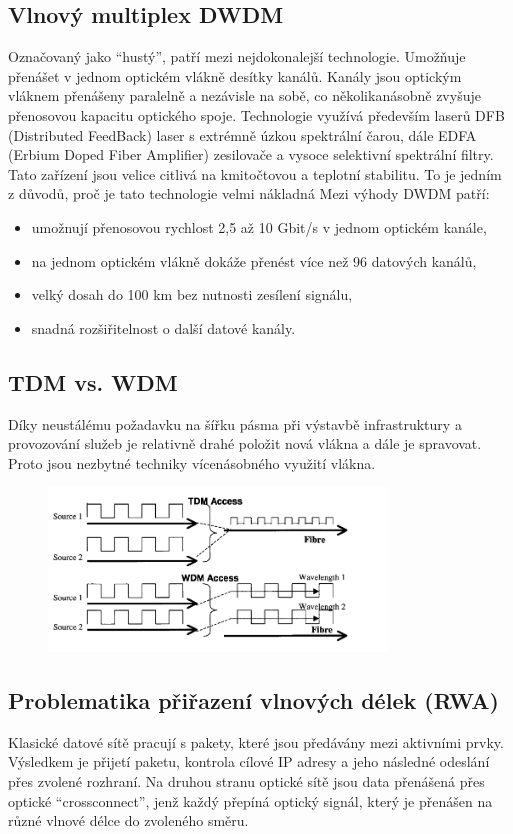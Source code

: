 \subsection{Vlnový multiplex DWDM}
Označovaný jako \enquote{hustý}, patří mezi nejdokonalejší technologie. Umožňuje přenášet v jednom optickém vlákně desítky kanálů. Kanály jsou optickým vláknem přenášeny paralelně a nezávisle na sobě, co několikanásobně zvyšuje přenosovou kapacitu optického spoje. Technologie využívá především laserů DFB (Distributed FeedBack) laser s extrémně úzkou spektrální čarou, dále EDFA (Erbium Doped Fiber Amplifier) zesilovače a vysoce selektivní
spektrální filtry. Tato zařízení jsou velice citlivá na kmitočtovou a teplotní stabilitu. To je jedním z důvodů, proč je tato technologie velmi nákladná
Mezi výhody DWDM patří:
\begin{itemize}
    \item umožnují přenosovou rychlost 2,5 až 10 Gbit/s v jednom optickém kanále,
    \item na jednom optickém vlákně dokáže přenést více než 96 datových kanálů,
    \item velký dosah do 100 km bez nutnosti zesílení signálu,
    \item snadná rozšiřitelnost o další datové kanály.
\end{itemize}

\subsection{TDM vs. WDM}
Díky neustálému požadavku na šířku pásma při výstavbě infrastruktury a provozování služeb je relativně drahé položit nová vlákna a dále je
spravovat. Proto jsou nezbytné techniky vícenásobného využití vlákna.
\begin{figure} [h]
    \centering
    \includegraphics[width=0.8\textwidth]{snimky/TDMvsWDM.png}
    \label{fig:tdm-wdm}
\end{figure}

\subsection{Problematika přiřazení vlnových délek (RWA)}
Klasické datové sítě pracují s pakety, které jsou předávány mezi aktivními prvky. Výsledkem je přijetí paketu, kontrola cílové IP adresy a jeho následné odeslání přes zvolené rozhraní. Na druhou stranu optické sítě jsou data přenášená přes optické \enquote{crossconnect}, jenž každý přepíná optický signál, který je přenášen na různé vlnové délce do zvoleného směru.

